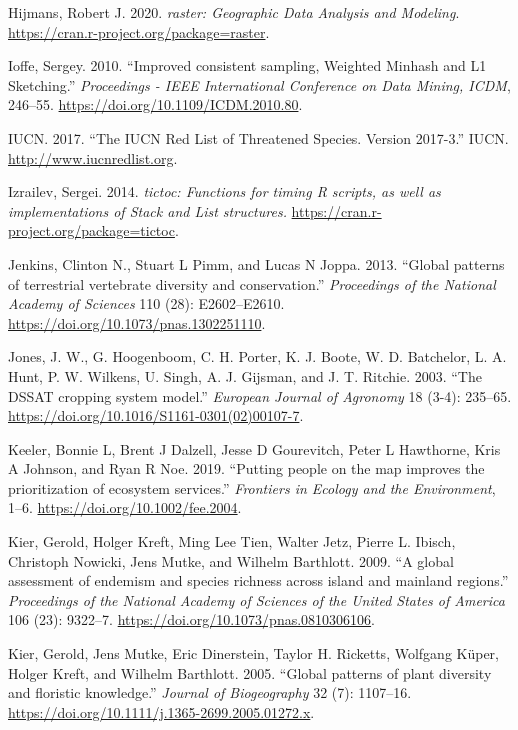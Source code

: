 \documentclass[
]{article}
\begin{document}
\leavevmode\hypertarget{ref-R-raster}{}%
Hijmans, Robert J. 2020. \emph{raster: Geographic Data Analysis and Modeling}. \url{https://cran.r-project.org/package=raster}.

\leavevmode\hypertarget{ref-Ioffe2010}{}%
Ioffe, Sergey. 2010. ``Improved consistent sampling, Weighted Minhash and L1 Sketching.'' \emph{Proceedings - IEEE International Conference on Data Mining, ICDM}, 246--55. \url{https://doi.org/10.1109/ICDM.2010.80}.

\leavevmode\hypertarget{ref-IUCN2017}{}%
IUCN. 2017. ``The IUCN Red List of Threatened Species. Version 2017-3.'' IUCN. \url{http://www.iucnredlist.org}.

\leavevmode\hypertarget{ref-R-tictoc}{}%
Izrailev, Sergei. 2014. \emph{tictoc: Functions for timing R scripts, as well as implementations of Stack and List structures.} \url{https://cran.r-project.org/package=tictoc}.

\leavevmode\hypertarget{ref-Jenkins2013}{}%
Jenkins, Clinton N., Stuart L Pimm, and Lucas N Joppa. 2013. ``Global patterns of terrestrial vertebrate diversity and conservation.'' \emph{Proceedings of the National Academy of Sciences} 110 (28): E2602--E2610. \url{https://doi.org/10.1073/pnas.1302251110}.

\leavevmode\hypertarget{ref-Jones2003}{}%
Jones, J. W., G. Hoogenboom, C. H. Porter, K. J. Boote, W. D. Batchelor, L. A. Hunt, P. W. Wilkens, U. Singh, A. J. Gijsman, and J. T. Ritchie. 2003. ``The DSSAT cropping system model.'' \emph{European Journal of Agronomy} 18 (3-4): 235--65. \url{https://doi.org/10.1016/S1161-0301(02)00107-7}.

\leavevmode\hypertarget{ref-Keeler2019}{}%
Keeler, Bonnie L, Brent J Dalzell, Jesse D Gourevitch, Peter L Hawthorne, Kris A Johnson, and Ryan R Noe. 2019. ``Putting people on the map improves the prioritization of ecosystem services.'' \emph{Frontiers in Ecology and the Environment}, 1--6. \url{https://doi.org/10.1002/fee.2004}.

\leavevmode\hypertarget{ref-Kier2009}{}%
Kier, Gerold, Holger Kreft, Ming Lee Tien, Walter Jetz, Pierre L. Ibisch, Christoph Nowicki, Jens Mutke, and Wilhelm Barthlott. 2009. ``A global assessment of endemism and species richness across island and mainland regions.'' \emph{Proceedings of the National Academy of Sciences of the United States of America} 106 (23): 9322--7. \url{https://doi.org/10.1073/pnas.0810306106}.

\leavevmode\hypertarget{ref-Kier2005}{}%
Kier, Gerold, Jens Mutke, Eric Dinerstein, Taylor H. Ricketts, Wolfgang Küper, Holger Kreft, and Wilhelm Barthlott. 2005. ``Global patterns of plant diversity and floristic knowledge.'' \emph{Journal of Biogeography} 32 (7): 1107--16. \url{https://doi.org/10.1111/j.1365-2699.2005.01272.x}.
\end{document}
